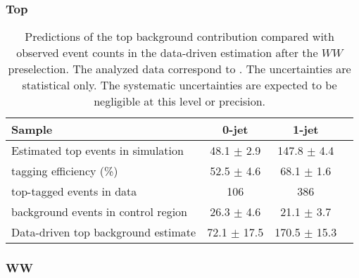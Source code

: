 \subsubsection{Top}

\begin{table}[!htbp]
\begin{center}
\begin{tabular}{l c c c}
\hline
Sample                                        &   0-jet          & 1-jet          \\
\hline
Estimated top events in simulation  	      &  48.1 $\pm$ 2.9  & 147.8 $\pm$ 4.4 \\
tagging efficiency (\%)                       &  52.5 $\pm$ 4.6  &  68.1 $\pm$ 1.6 \\
top-tagged events in data           	      &          106     &    386          \\
background events in control region           &  26.3 $\pm$ 4.6  &  21.1 $\pm$ 3.7 \\
Data-driven top background estimate           &  72.1 $\pm$ 17.5 & 170.5 $\pm$ 15.3\\
\hline
\end{tabular}
\caption{Predictions of the top background contribution compared 
with observed event counts in the data-driven estimation after the $WW$ preselection. 
The analyzed data correspond to \lpintlumi.
The uncertainties are statistical only. The systematic uncertainties are expected to be 
negligible at this level or precision.}
\label{tab:lp_ttbar_est}
\end{center}
\end{table}


\subsubsection{WW}

